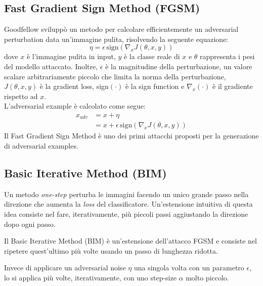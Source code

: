     \subsection{Fast Gradient Sign Method (FGSM)}
    \label{FGSM}
    Goodfellow \cite{goodfellow2014explaining} sviluppò un metodo per calcolare efficientemente un adversarial perturbation data un'immagine pulita, risolvendo la seguente equazione:
        \begin{equation}
            \eta = \epsilon\, \text{sign} (\nabla_x J(\theta, x, y))
        \end{equation}
        dove $x$ è l'immagine pulita in input, $y$ è la classe reale di $x$ e $\theta$ rappresenta i pesi del modello attaccato. Inoltre, $\epsilon$ è la magnitudine della perturbazione, un valore scalare arbitrariamente piccolo che limita la norma della perturbazione, $J(\theta, x, y)$ è la gradient loss, sign$(\cdot)$ è la sign function e $\nabla_x(\cdot)$ è il gradiente rispetto ad $x$.\\
    \newline
    L'adversarial example è calcolato come segue:
        \begin{equation}
            \begin{split}
                x_{adv} &= x + \eta \\
                        &= x + \epsilon\, \text{sign} (\nabla_x J(\theta, x, y))
            \end{split}
        \end{equation}
    Il Fast Gradient Sign Method è uno dei primi attacchi proposti per la generazione di adversarial examples.
    \newpage
    \subsection{Basic Iterative Method (BIM)}
    \label{BIM}
    Un metodo \textit{one-step} perturba le immagini facendo un unico grande passo nella direzione che aumenta la \textit{loss} del classificatore. Un'estensione intuitiva di questa idea consiste nel fare, iterativamente, più piccoli passi aggiustando la direzione dopo ogni passo.
    
    Il Basic Iterative Method (BIM) \cite{kurakin2016adversarial} è un'estensione dell'attacco FGSM e consiste nel ripetere quest'ultimo più volte usando un passo di lunghezza ridotta.
    
    Invece di applicare un adversarial noise $\eta$ una singola volta con un parametro $\epsilon$, lo si applica più volte, iterativamente, con uno step-size $\alpha$ molto piccolo.\\
    
